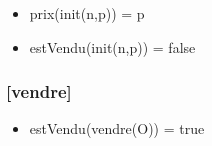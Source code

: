 \documentclass[11pt]{article}
\begin{document}
\begin{itemize}

\item prix(init(n,p)) = p\\
\label{sec-1.7.1.1}


\item estVendu(init(n,p)) = false\\
\label{sec-1.7.1.2}


\end{itemize} %
\subsubsection{[vendre]}
\label{sec-1.7.2}

\begin{itemize}

\item estVendu(vendre(O)) = true\\
\label{sec-1.7.2.1}

\end{itemize} %
\end{document}
